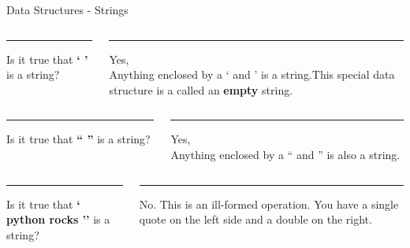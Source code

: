 \begin{frame}[fragile]{Data Structures - Strings}
  \begin{columns}[T]
    \begin{column}{.48\textwidth}
      \color{black}\rule{\linewidth}{0.5pt}
      Is it true that \textbf{` '} is a string? 
      \\
    \end{column}
    \hfill
    \pause
    \begin{column}{.48\textwidth}
      \color{red}\rule{\linewidth}{0.5pt}
      Yes, \\
      Anything enclosed by a ` and '  is a string.This special data structure is a called an \textbf{empty} string.
    \end{column}
    \pause
  \end{columns}

  \vspace{1em}
  
  \begin{columns}[T]
    \begin{column}{.48\textwidth}
      \color{black}\rule{\linewidth}{0.5pt}
      Is it true that \textbf{`` ''} is a string? 
      \\
    \end{column}
    \hfill
    \pause
    \begin{column}{.48\textwidth}
      \color{red}\rule{\linewidth}{0.5pt}
      Yes, \\
      Anything enclosed by a ``  and ''  is also a string.
    \end{column}
    \pause
  \end{columns}

  \vspace{1em}
  
  \begin{columns}[T]
    \begin{column}{.48\textwidth}
      \color{black}\rule{\linewidth}{0.5pt}
      Is it true that \textbf{` python rocks ''} is a string? 
      \\
    \end{column}
    \hfill
    \pause
    \begin{column}{.48\textwidth}
      \color{red}\rule{\linewidth}{0.5pt}
      No. This is an ill-formed operation. You have a single quote on the left side and a double on the right.
    \end{column}
  \end{columns}

\end{frame}

